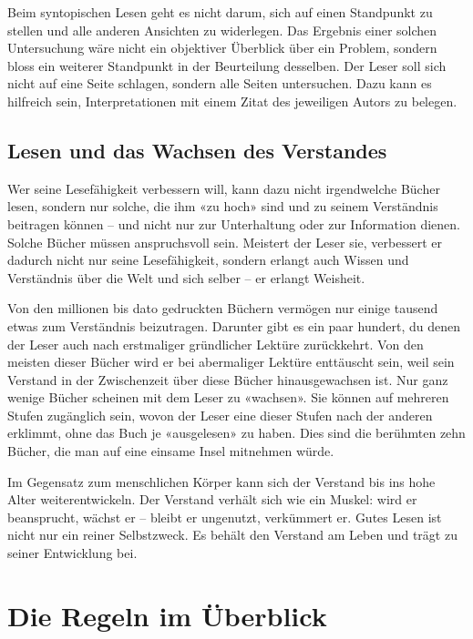 \documentclass[a4paper,11pt]{scrartcl}
\begin{document}
Beim syntopischen Lesen geht es nicht darum, sich auf einen Standpunkt zu stellen und alle anderen Ansichten zu widerlegen. Das Ergebnis einer solchen Untersuchung wäre nicht ein objektiver Überblick über ein Problem, sondern bloss ein weiterer Standpunkt in der Beurteilung desselben. Der Leser soll sich nicht auf eine Seite schlagen, sondern alle Seiten untersuchen. Dazu kann es hilfreich sein, Interpretationen mit einem Zitat des jeweiligen Autors zu belegen.

\subsection{Lesen und das Wachsen des Verstandes}

Wer seine Lesefähigkeit verbessern will, kann dazu nicht irgendwelche Bücher lesen, sondern nur solche, die ihm «zu hoch» sind und zu seinem Verständnis beitragen können – und nicht nur zur Unterhaltung oder zur Information dienen. Solche Bücher müssen anspruchsvoll sein. Meistert der Leser sie, verbessert er dadurch nicht nur seine Lesefähigkeit, sondern erlangt auch Wissen und Verständnis über die Welt und sich selber – er erlangt Weisheit.

Von den millionen bis dato gedruckten Büchern vermögen nur einige tausend etwas zum Verständnis beizutragen. Darunter gibt es ein paar hundert, du denen der Leser auch nach erstmaliger gründlicher Lektüre zurückkehrt. Von den meisten dieser Bücher wird er bei abermaliger Lektüre enttäuscht sein, weil sein Verstand in der Zwischenzeit über diese Bücher hinausgewachsen ist. Nur ganz wenige Bücher scheinen mit dem Leser zu «wachsen». Sie können auf mehreren Stufen zugänglich sein, wovon der Leser eine dieser Stufen nach der anderen erklimmt, ohne das Buch je «ausgelesen» zu haben. Dies sind die berühmten zehn Bücher, die man auf eine einsame Insel mitnehmen würde.

Im Gegensatz zum menschlichen Körper kann sich der Verstand bis ins hohe Alter weiterentwickeln. Der Verstand verhält sich wie ein Muskel: wird er beansprucht, wächst er – bleibt er ungenutzt, verkümmert er. Gutes Lesen ist nicht nur ein reiner Selbstzweck. Es behält den Verstand am Leben und trägt zu seiner Entwicklung bei.

\newpage
\section*{Die Regeln im Überblick}
\end{document}
